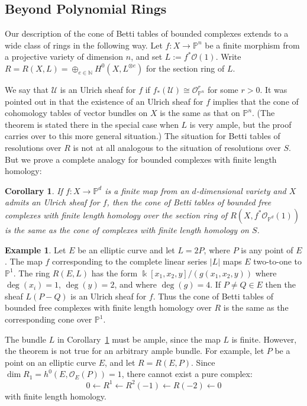 \documentclass[12pt]{amsart}
\newtheorem{cor}[lemma]{Corollary}
\theoremstyle{definition}
\newtheorem{example}[lemma]{Example}
\theoremstyle{remark}
\newcommand{\kk}{\Bbbk}
\newcommand{\PP}{\mathbb{P}}
\newcommand{\cO}{\mathcal{O}}
\newcommand{\cU}{\mathcal{U}}
\newcommand{\defi}[1]{\textsf{#1}} %
\renewcommand{\P}{{\mathbb P}}
\begin{document}
\subsection*{Beyond Polynomial Rings}
Our description of the cone of Betti tables of bounded complexes
extends to a wide class of rings in the following way. Let $f:X\to \PP^{n}$ be a finite
morphism from a projective variety of dimension $n$, and set $L:=f^*\cO(1)$. 
Write $R=R(X,L)=\oplus_{e\in \mathbb N} H^0(X,L^{\otimes e})$ for the \defi{section ring}
of $L$.

We say that $\cU$ is an \defi{Ulrich sheaf} for $f$ if $f_*(\cU)\cong \cO_{\PP^n}^r$ for some $r>0$.  It was pointed out in \cite[Theorem~5]{eis-schrey-abel} that the existence of an Ulrich sheaf for $f$ implies that  the cone of cohomology tables of vector bundles on $X$ is the same as that on $\PP^{n}$. (The theorem is stated there in the special case when $L$ is very ample, but the proof
carries over to this more general situation.) The situation for Betti tables of resolutions over $R$ is not at all analogous to the situation of resolutions over $S$. But we prove a complete analogy for bounded complexes with finite length homology:

\begin{cor}\label{cor:isom cones}
If $f:X\to \P^{d}$ is a  finite map from an $d$-dimensional variety and $X$ admits an Ulrich sheaf for $f$, then the cone of Betti tables
of bounded free complexes with finite length homology over  the section ring
of $R(X,f^*\cO_{\PP^d}(1))$ is the same
as the cone of complexes with finite length homology on $S$. 
\end{cor}

\begin{example}\label{ex:elliptic}
Let $E$ be an elliptic curve and let $L=2P$, where $P$ is any point of $E$.  The map $f$ corresponding to the complete
linear series $|L|$ maps $E$ two-to-one to $\P^{1}$. The ring $R(E,L)$ has the form
$\kk[x_1,x_2,y]/(g(x_{1},x_{2},y))$  where $\deg(x_i)=1$, $\deg(y)=2$, and where $\deg(g)=4$.
If $P\neq Q\in E$ then the sheaf $L(P-Q)$ is an Ulrich sheaf for $f$. Thus the cone of
Betti tables of bounded free complexes with finite length homology over $R$ is the same
as the corresponding cone over $\P^{1}$.

The bundle $L$ in Corollary~\ref{cor:isom cones} must be ample, since the map $L$ is finite.  However, the theorem is not true for an arbitrary ample bundle.  For example, let $P$ be a point on an elliptic curve $E$, and let $R=R(E,P)$.  Since $\dim R_1=h^0(E,\cO_E(P))=1$, there cannot exist a pure complex:
\[
0\gets R^1\gets R^2(-1)\gets R(-2)\gets 0
\]
with finite length homology.
\end{example}
\end{document}
